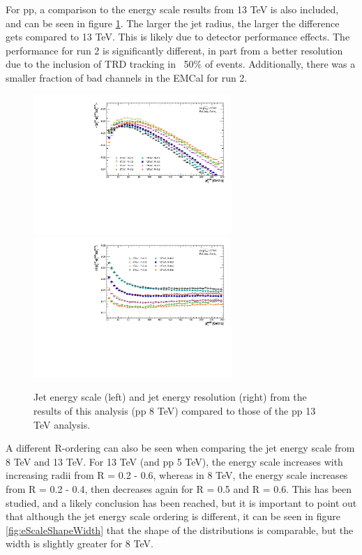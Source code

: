\documentclass[ALICE]{ALICE_analysis_notes}
\newcommand{\pp}{pp\xspace}
\begin{document}
For \pp, a comparison to the energy scale results from 13 TeV is also included, and can be seen in figure \ref{fig:EnergyScaleComp}. The larger the jet radius, the larger the difference gets compared to 13 TeV. This is likely due to detector performance effects. The performance for run 2 is significantly different, in part from a better resolution due to the inclusion of TRD tracking in ~50\% of events. Additionally, there was a smaller fraction of bad channels in the EMCal for run 2.

\begin{figure}[h!]
    \centering
    \begin{multicols}{2}
            \includegraphics[width=7.5cm]{figures/EnergyScale/EnergyScaleMean_Comparison.pdf}
        \vfill\null 
        \columnbreak
            \includegraphics[width=7.5cm]{figures/EnergyScale/EnergyScaleWidth_Comparison.pdf}
        \vfill\null
    \end{multicols}
    \caption{Jet energy scale (left) and jet energy resolution (right) from the results of this analysis (\pp 8 TeV) compared to those of the \pp 13 TeV analysis.}
    \label{fig:EnergyScaleComp}
\end{figure}

A different R-ordering can also be seen when comparing the jet energy scale from 8 TeV and 13 TeV. For 13 TeV (and \pp 5 TeV), the energy scale increases with increasing radii from R = 0.2 - 0.6, whereas in 8 TeV, the energy scale increases from R = 0.2 - 0.4, then decreases again for R = 0.5 and R = 0.6. This has been studied, and a likely conclusion has been reached, but it is important to point out that although the jet energy scale ordering is different, it can be seen in figure \ref{fig:eScaleShapeWidth} that the shape of the distributions is comparable, but the width is slightly greater for 8 TeV.
\end{document}

